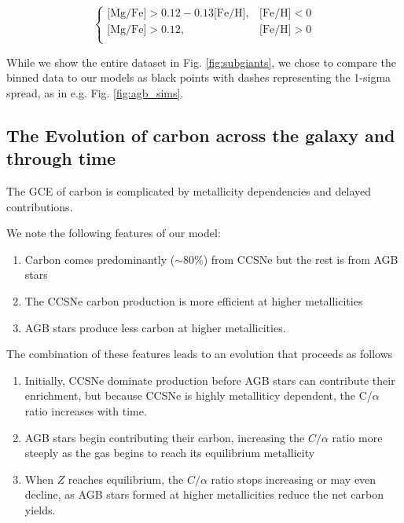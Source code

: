 \documentclass[fleqn,usenatbib]{mnras}
\begin{document}
\begin{equation}
\begin{cases}
\text{[Mg/Fe]} >0.12-0.13\text{[Fe/H]}, & \text{[Fe/H]}<0\\
\text{[Mg/Fe]} >0.12, & \text{[Fe/H]}>0\\
\end{cases}
\end{equation}

While we show the entire dataset in Fig. \ref{fig:subgiants}, we chose to compare the
binned data to our models as black points with dashes representing the 1-sigma
spread, as in e.g. Fig. \ref{fig:agb_sims}. 



\subsection{The Evolution of carbon across the galaxy and through time}

The GCE of carbon is complicated by metallicity dependencies and delayed contributions. 

We note the following features of our model:

\begin{enumerate}
    \item Carbon comes predominantly ($\sim80\%$) from CCSNe but the rest is from AGB stars
    \item The CCSNe carbon production is more efficient at higher metallicities
    \item AGB stars produce less carbon at higher metallicities.
\end{enumerate}


The combination of these features leads to an evolution that proceeds as follows
\begin{enumerate}
    \item Initially, CCSNe dominate production before AGB stars can contribute their enrichment, but because CCSNe is highly metalliticy dependent, the C/$\alpha$ ratio increases with time.
    \item AGB stars begin contributing their carbon, increasing the $C/\alpha$ ratio more steeply as the gas begins to reach its equilibrium metallicity
    \item When $Z$ reaches equilibrium, the $C/\alpha$ ratio stops increasing or may even decline, as AGB stars formed at higher metallicities reduce the net carbon yields.
\end{enumerate}
\end{document}
